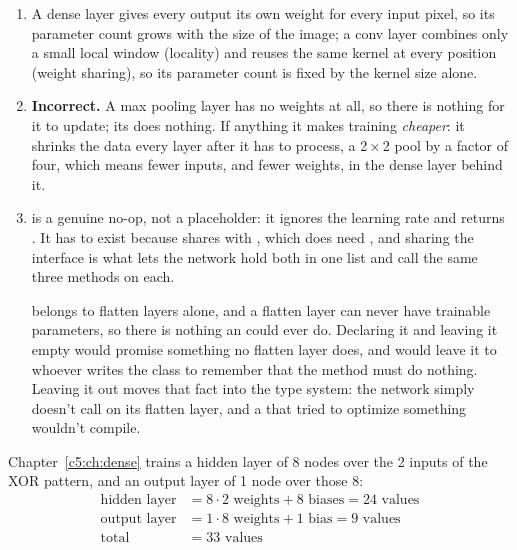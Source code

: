 \begin{enumerate}[start=6]
  \item A dense layer gives every output its own weight for every input pixel, so its parameter
    count grows with the size of the image; a conv layer combines only a small local window
    (locality) and reuses the same kernel at every position (weight sharing), so its parameter
    count is fixed by the kernel size alone.
  \item \textbf{Incorrect.} A max pooling layer has no weights at all, so there is nothing for it
    to update; its  does nothing. If anything it makes training \emph{cheaper}: it
    shrinks the data every layer after it has to process, a 2\,×\,2 pool by a factor of four, which
    means fewer inputs, and fewer weights, in the dense layer behind it.
  \item \textbf{} is a genuine no-op, not a placeholder: it ignores the
    learning rate and returns . It has to exist because  shares
     with , which does need , and sharing
    the interface is what lets the network hold both in one list and call the same three methods
    on each.

    \textbf{} belongs to flatten layers alone, and a flatten layer
    can never have trainable parameters, so there is nothing an  could ever do.
    Declaring it and leaving it empty would promise something no flatten layer does, and would
    leave it to whoever writes the class to remember that the method must do nothing. Leaving it
    out moves that fact into the type system: the network simply doesn't call  on
    its flatten layer, and a  that tried to optimize something wouldn't compile.
\end{enumerate}

Chapter~\ref{c5:ch:dense} trains a hidden layer of 8 nodes over the 2 inputs of the XOR pattern,
and an output layer of 1 node over those 8:
\begin{align*}
  \text{hidden layer} &= 8 \cdot 2 \text{ weights} + 8 \text{ biases} = 24 \text{ values} \\
  \text{output layer} &= 1 \cdot 8 \text{ weights} + 1 \text{ bias} = 9 \text{ values} \\
  \text{total} &= 33 \text{ values}
\end{align*}

